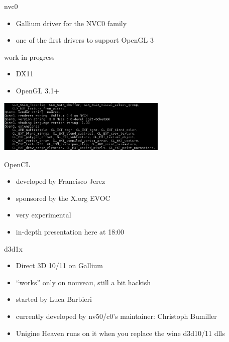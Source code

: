 \documentclass[11pt,english,compress]{beamer}
\begin{document}
		\begin{frame}
			\begin{block}{nvc0}
				\begin{itemize}
					\item Gallium driver for the NVC0 family
					\item one of the first drivers to support OpenGL 3
				\end{itemize}
			\end{block}
			\begin{block}{work in progress}
				\begin{itemize}
					\item DX11
					\item OpenGL 3.1+
				\end{itemize}
			\end{block}

			\begin{center}
				\includegraphics[height=2.5cm]{imgs/opengl3.png}
			\end{center}
		\end{frame}
		\begin{frame}
			\begin{block}{OpenCL}
				\begin{itemize}
					\item developed by Francisco Jerez
					\item sponsored by the X.org EVOC
					\item very experimental
					\item in-depth presentation here at 18:00
				\end{itemize}
			\end{block}

			\begin{block}{d3d1x}
				\begin{itemize}
					\item Direct 3D 10/11 on Gallium
					\item ``works'' only on nouveau, still a bit hackish
					\item started by Luca Barbieri
					\item currently developed by nv50/c0's maintainer: Christoph Bumiller
					\item Unigine Heaven runs on it when you replace the wine d3d10/11 dlls
				\end{itemize}
			\end{block}
		\end{frame}
\end{document}
